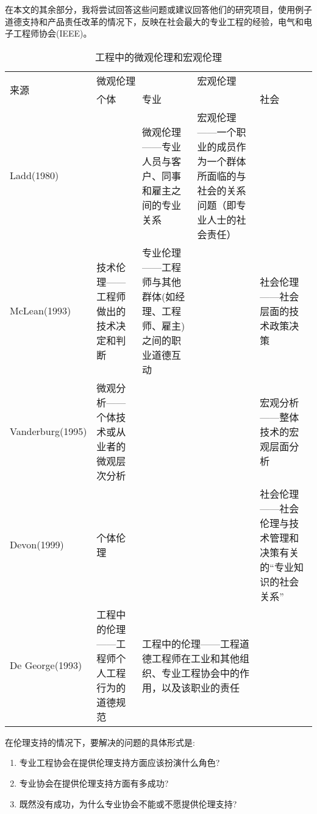 \documentclass[lang=cn,11pt,a4paper]{elegantpaper}
\begin{document}
在本文的其余部分，我将尝试回答这些问题或建议回答他们的研究项目，使用例子道德支持和产品责任改革的情况下，反映在社会最大的专业工程的经验，电气和电子工程师协会(IEEE)。

\begin{table}[htbp]

  \centering
  \caption{工程中的微观伦理和宏观伦理}
 
  \begin{tabular}{|l|p{2.5cm}|p{3cm}|p{3cm}|p{2.5cm}|}
    \hline
    \multirow{2}{*}{来源} & \multicolumn{2}{l|}{微观伦理} & \multicolumn{2}{l|}{宏观伦理} \\ \cline{2-5} 
                        & 个体          & \multicolumn{2}{l|}{专业}     & 社会          \\ \hline
    Ladd(1980)          &             & 微观伦理——专业人员与客户、同事和雇主之间的专业关系         & 宏观伦理——一个职业的成员作为一个群体所面临的与社会的关系问题（即专业人士的社会责任）          &             \\ \hline
    McLean(1993)        & 技术伦理——工程师做出的技术决定和判断          & 专业伦理——工程师与其他群体(如经理、工程师、雇主)之间的职业道德互动          &             & 社会伦理——社会层面的技术政策决策          \\ \hline
    Vanderburg(1995)    & 微观分析——个体技术或从业者的微观层次分析          &             &             & 宏观分析——整体技术的宏观层面分析          \\ \hline
    Devon(1999)         & 个体伦理          &             &             & 社会伦理——社会伦理与技术管理和决策有关的“专业知识的社会关系”          \\ \hline
    De George(1993)     & 工程中的伦理——工程师个人工程行为的道德规范          & \multicolumn{2}{p{6cm}|}{工程中的伦理——工程道德工程师在工业和其他组织、专业工程协会中的作用，以及该职业的责任}   &             \\ \hline
  \end{tabular}
\end{table}

在伦理支持的情况下，要解决的问题的具体形式是:

\begin{enumerate}
  \item 专业工程协会在提供伦理支持方面应该扮演什么角色?
  \item 专业协会在提供伦理支持方面有多成功?
  \item 既然没有成功，为什么专业协会不能或不愿提供伦理支持?
\end{enumerate}
\end{document}
